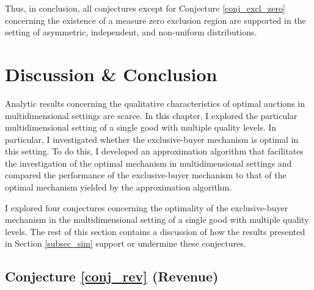 
Thus, in conclusion, all conjectures except for Conjecture \ref{conj_excl_zero} concerning the existence of a measure zero exclusion region are supported in the setting of asymmetric, independent, and non-uniform distributions.




\section{Discussion \& Conclusion}\label{sec_discuss}

Analytic results concerning the qualitative characteristics of optimal auctions in multidimensional settings are scarce. In this chapter, I explored the particular multidimensional setting of a single good with multiple quality levels. In particular, I investigated whether the exclusive-buyer mechanism is optimal in this setting. To do this, I developed an approximation algorithm that facilitates the investigation of the optimal mechanism in multidimensional settings and compared the performance of the exclusive-buyer mechanism to that of the optimal mechanism yielded by the approximation algorithm. 

I explored four conjectures concerning the optimality of the exclusive-buyer mechanism in the multidimensional setting of a single good with multiple quality levels. The rest of this section contains a discussion of how the results presented in Section \ref{subsec_sim} support or undermine these conjectures.

\subsection{Conjecture \ref{conj_rev} (Revenue)}

